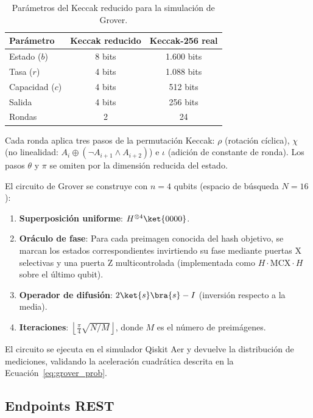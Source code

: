 \begin{table}[htbp]
\centering
\caption{Parámetros del Keccak reducido para la simulación de Grover.}
\label{tab:toy_keccak}
\begin{tabular}{@{}lcc@{}}
\toprule
\textbf{Parámetro} & \textbf{Keccak reducido} & \textbf{Keccak-256 real} \\
\midrule
Estado ($b$) & 8 bits & 1.600 bits \\
Tasa ($r$) & 4 bits & 1.088 bits \\
Capacidad ($c$) & 4 bits & 512 bits \\
Salida & 4 bits & 256 bits \\
Rondas & 2 & 24 \\
\bottomrule
\end{tabular}
\end{table}

Cada ronda aplica tres pasos de la permutación Keccak: $\rho$ (rotación cíclica), $\chi$ (no linealidad: $A_i \oplus (\neg A_{i+1} \wedge A_{i+2})$) e $\iota$ (adición de constante de ronda). Los pasos $\theta$ y $\pi$ se omiten por la dimensión reducida del estado.

El circuito de Grover se construye con $n = 4$ qubits (espacio de búsqueda $N = 16$):

\begin{enumerate}
  \item \textbf{Superposición uniforme}: $H^{\otimes 4}\ket{0000}$.
  \item \textbf{Oráculo de fase}: Para cada preimagen conocida del hash objetivo, se marcan los estados correspondientes invirtiendo su fase mediante puertas X selectivas y una puerta Z multicontrolada (implementada como $H \cdot \text{MCX} \cdot H$ sobre el último qubit).
  \item \textbf{Operador de difusión}: $2\ket{s}\bra{s} - I$ (inversión respecto a la media).
  \item \textbf{Iteraciones}: $\left\lfloor \frac{\pi}{4}\sqrt{N/M} \right\rfloor$, donde $M$ es el número de preimágenes.
\end{enumerate}

El circuito se ejecuta en el simulador Qiskit Aer y devuelve la distribución de mediciones, validando la aceleración cuadrática descrita en la Ecuación~\ref{eq:grover_prob}.

\subsection{Endpoints REST}

